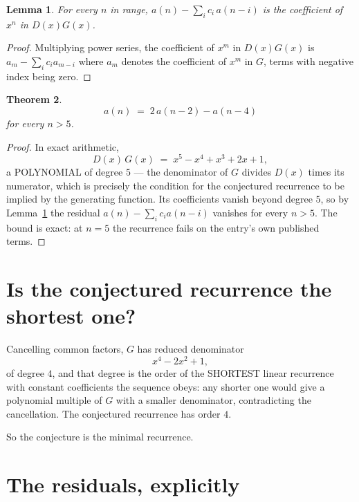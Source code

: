 \documentclass[11pt,a4paper]{article}
\theoremstyle{plain}
\newtheorem{theorem}{Theorem}
\newtheorem{lemma}[theorem]{Lemma}
\theoremstyle{definition}
\begin{document}
\begin{lemma}\label{lem:key}
For every $n$ in range, $a(n)-\sum_i c_i\,a(n-i)$ is the coefficient of $x^{n}$ in
$D(x)G(x)$.
\end{lemma}

\begin{proof}
Multiplying power series, the coefficient of $x^{m}$ in $D(x)G(x)$ is
$a_m-\sum_i c_i a_{m-i}$ where $a_m$ denotes the coefficient of $x^{m}$ in $G$, terms with
negative index being zero.
\end{proof}

\begin{theorem}
\[
a(n)\;=\;2\,a(n-2) - a(n-4)
\]
for every $n>5$.
\end{theorem}

\begin{proof}
In exact arithmetic,
\[
D(x)\,G(x)\;=\;x^{5} - x^{4} + x^{3} + 2 x + 1,
\]
a POLYNOMIAL of degree $5$ --- the denominator of $G$ divides $D(x)$ times its numerator,
which is precisely the condition for the conjectured recurrence to be implied by the
generating function. Its coefficients vanish beyond degree $5$, so by
Lemma~\ref{lem:key} the residual $a(n)-\sum_ic_ia(n-i)$ vanishes for every
$n>5$. The bound is exact: at $n=5$ the recurrence fails on the entry's own published terms.
\end{proof}

\section{Is the conjectured recurrence the shortest one?}

Cancelling common factors, $G$ has reduced denominator
\[
x^{4} - 2 x^{2} + 1,
\]
of degree $4$, and that degree is the order of the SHORTEST linear recurrence with
constant coefficients the sequence obeys: any shorter one would give a polynomial multiple of
$G$ with a smaller denominator, contradicting the cancellation. The conjectured recurrence has
order $4$.

So the conjecture is the minimal recurrence.

\section{The residuals, explicitly}
\end{document}
